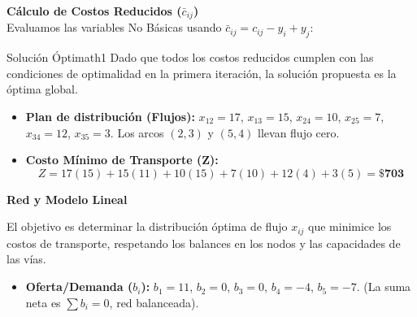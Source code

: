 \documentclass[10pt,a4paper]{article}
\begin{document}
\textbf{Cálculo de Costos Reducidos ($\bar{c}_{ij}$)}\\
Evaluamos las variables No Básicas usando $\bar{c}_{ij} = c_{ij} - y_i + y_j$:
\begin{table}[H]
\centering
{}
\end{table}

\begin{mytheo}{Solución Óptima}{th1}
Dado que todos los costos reducidos cumplen con las condiciones de optimalidad en la primera iteración, la solución propuesta es la óptima global.
\begin{itemize}
    \item \textbf{Plan de distribución (Flujos):} $x_{12}=17$, $x_{13}=15$, $x_{24}=10$, $x_{25}=7$, $x_{34}=12$, $x_{35}=3$. Los arcos $(2,3)$ y $(5,4)$ llevan flujo cero.
    \item \textbf{Costo Mínimo de Transporte (Z):} 
    \[ Z = 17(15) + 15(11) + 10(15) + 7(10) + 12(4) + 3(5) = \mathbf{\$703} \]
\end{itemize}
\end{mytheo}

\newpage


\textbf{Red y Modelo Lineal}

El objetivo es determinar la distribución óptima de flujo $x_{ij}$ que minimice los costos de transporte, respetando los balances en los nodos y las capacidades de las vías.

\begin{itemize}
    \item \textbf{Oferta/Demanda ($b_i$):} $b_1 = 11$, $b_2 = 0$, $b_3 = 0$, $b_4 = -4$, $b_5 = -7$. (La suma neta es $\sum b_i = 0$, red balanceada).
\end{itemize}
\end{document}
